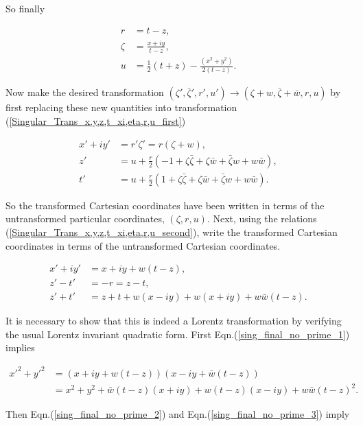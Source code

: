 \noindent So finally

\begin{align}\nonumber
r & = t - z, \\\nonumber
\zeta & = \frac{x + i y}{t-z}, \\\label{Singular_Trans_x,y,z,t_xi,eta,r,u_second}
u & = \frac{1}{2} (t + z) - \frac{(x^2 + y^2)}{2(t - z)}.
\end{align}

\noindent Now make the desired transformation $(\zeta', \bar{\zeta}', r', u') \rightarrow (\zeta + w, \bar{\zeta} + \bar{w}, r, u)$ by first replacing these new quantities into transformation (\ref{Singular_Trans_x,y,z,t_xi,eta,r,u_first})

\begin{align*}
x' + iy' & = r'\zeta' = r(\zeta + w), \\
z' & = u + \frac{r}{2}(-1 + \zeta \bar{\zeta} + \zeta \bar{w} + \bar{\zeta} w + w \bar{w}), \\
t' & = u + \frac{r}{2} (1 + \zeta \bar{\zeta} + \zeta \bar{w} + \bar{\zeta} w + w \bar{w}). 
\end{align*}

\noindent So the transformed Cartesian coordinates have been written in terms of the untransformed particular coordinates, $(\zeta, r, u)$. Next, using the relations (\ref{Singular_Trans_x,y,z,t_xi,eta,r,u_second}), write the transformed Cartesian coordinates in terms of the untransformed Cartesian coordinates.

\begin{align}
x' + i y' & = x + iy + w(t-z) \label{sing_final_no_prime_1}, \\
z' - t' & = -r = z - t \label{sing_final_no_prime_2}, \\
z' + t' & = z+t + w(x - i y) + w(x + iy) + w\bar{w} (t-z) \label{sing_final_no_prime_3}.
\end{align}

It is necessary to show that this is indeed a Lorentz transformation by verifying the usual Lorentz invariant quadratic form. First Eqn.(\ref{sing_final_no_prime_1}) implies

\begin{align*}
{x'}^2 + {y'}^2 &  = (x + iy + w(t-z))(x - iy + \bar{w}(t-z)) \\
& = x^2 + y^2 + \bar{w}(t - z)(x+iy) + w(t-z)(x-iy) + w\bar{w}{(t-z)}^2.
\end{align*}

\noindent Then Eqn.(\ref{sing_final_no_prime_2}) and Eqn.(\ref{sing_final_no_prime_3}) imply

